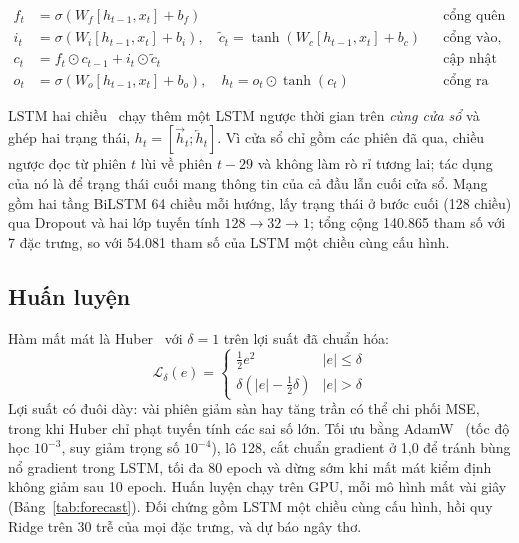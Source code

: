 \begin{align}
  f_t &= \sigma\!\left(W_f [h_{t-1}, x_t] + b_f\right) & &\text{cổng quên} \label{eq:lstm-f}\\
  i_t &= \sigma\!\left(W_i [h_{t-1}, x_t] + b_i\right), \quad
  \tilde c_t = \tanh\!\left(W_c [h_{t-1}, x_t] + b_c\right) & &\text{cổng vào, ứng viên} \\
  c_t &= f_t \odot c_{t-1} + i_t \odot \tilde c_t & &\text{cập nhật ô nhớ} \\
  o_t &= \sigma\!\left(W_o [h_{t-1}, x_t] + b_o\right), \quad h_t = o_t \odot \tanh(c_t) & &\text{cổng ra} \label{eq:lstm-o}
\end{align}

LSTM hai chiều~\cite{schuster1997brnn} chạy thêm một LSTM ngược thời gian trên \emph{cùng cửa sổ} và ghép hai trạng
thái, $h_t = [\overrightarrow{h}_t ; \overleftarrow{h}_t]$. Vì cửa sổ chỉ gồm các phiên đã qua, chiều ngược đọc từ
phiên $t$ lùi về phiên $t-29$ và không làm rò rỉ tương lai; tác dụng của nó là để trạng thái cuối mang thông tin của
cả đầu lẫn cuối cửa sổ. Mạng gồm hai tầng BiLSTM 64 chiều mỗi hướng, lấy trạng thái ở bước cuối (128 chiều) qua
Dropout và hai lớp tuyến tính $128 \to 32 \to 1$; tổng cộng 140.865 tham số với 7 đặc trưng, so với 54.081 tham số
của LSTM một chiều cùng cấu hình.




\subsection{Huấn luyện}
Hàm mất mát là Huber~\cite{huber1964robust} với $\delta = 1$ trên lợi suất đã chuẩn hóa:
\begin{equation}
  \mathcal{L}_\delta(e) = \begin{cases} \tfrac12 e^2 & |e| \le \delta \\ \delta\left(|e| - \tfrac12\delta\right) &
  |e| > \delta \end{cases}
\end{equation}
Lợi suất có đuôi dày: vài phiên giảm sàn hay tăng trần có thể chi phối MSE, trong khi Huber chỉ phạt tuyến tính các
sai số lớn. Tối ưu bằng AdamW~\cite{loshchilov2019adamw} (tốc độ học $10^{-3}$, suy giảm trọng số $10^{-4}$), lô 128,
cắt chuẩn gradient ở 1,0 để tránh bùng nổ gradient trong LSTM, tối đa 80 epoch và dừng sớm khi mất mát kiểm định
không giảm sau 10 epoch. Huấn luyện chạy trên GPU, mỗi mô hình mất vài giây
(Bảng~\ref{tab:forecast}). Đối chứng gồm LSTM một chiều cùng cấu hình, hồi quy Ridge trên 30 trễ của mọi đặc
trưng, và dự báo ngây thơ.

